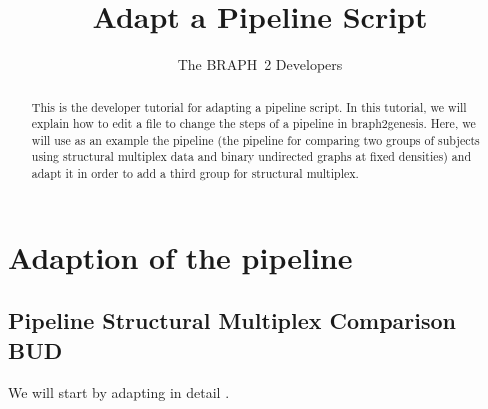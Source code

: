 \documentclass{tufte-handout}
\title{Adapt a Pipeline Script}
\author[The BRAPH~2 Developers]{The BRAPH~2 Developers}
\begin{document}
\maketitle

\begin{abstract}
\noindent
This is the developer tutorial for adapting a pipeline script. 
In this tutorial, we will explain how to edit a  file to change the steps of a pipeline in braph2genesis. Here, we will use as an example the pipeline  (the pipeline for comparing two groups of subjects using structural multiplex data and binary undirected graphs at fixed densities) and adapt it in order to add a third group for structural multiplex.
\end{abstract}

\tableofcontents

\clearpage
\section{Adaption of the pipeline}
\subsection{Pipeline Structural Multiplex Comparison BUD}

We will start by adapting in detail .
\end{document}
